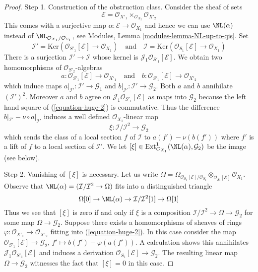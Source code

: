 \begin{proof}
\medskip\noindent
Step 1. Construction of the obstruction class. Consider the sheaf
of sets
$$
\mathcal{E} = \mathcal{O}_{X'_1} \times_{\mathcal{O}_{X_2}} \mathcal{O}_{X'_2}
$$
This comes with a surjective map $\alpha : \mathcal{E} \to \mathcal{O}_{X_1}$
and hence we can use $\NL(\alpha)$ instead of
$\NL_{\mathcal{O}_{X_1}/\mathcal{O}_{S_1}}$, see
Modules, Lemma \ref{modules-lemma-NL-up-to-qis}.
Set
$$
\mathcal{I}' =
\text{Ker}(\mathcal{O}_{S'_1}[\mathcal{E}] \to \mathcal{O}_{X_1})
\quad\text{and}\quad
\mathcal{I} =
\text{Ker}(\mathcal{O}_{S_1}[\mathcal{E}] \to \mathcal{O}_{X_1})
$$
There is a surjection $\mathcal{I}' \to \mathcal{I}$ whose kernel
is $\mathcal{J}_1\mathcal{O}_{S'_1}[\mathcal{E}]$.
We obtain two homomorphisms of $\mathcal{O}_{S'_2}$-algebras
$$
a : \mathcal{O}_{S'_1}[\mathcal{E}] \to \mathcal{O}_{X'_1}
\quad\text{and}\quad
b : \mathcal{O}_{S'_1}[\mathcal{E}] \to \mathcal{O}_{X'_2}
$$
which induce maps $a|_{\mathcal{I}'} : \mathcal{I}' \to \mathcal{G}_1$ and
$b|_{\mathcal{I}'} : \mathcal{I}' \to \mathcal{G}_2$. Both $a$ and $b$
annihilate $(\mathcal{I}')^2$. Moreover $a$ and $b$ agree on
$\mathcal{J}_1\mathcal{O}_{S'_1}[\mathcal{E}]$ as maps into $\mathcal{G}_2$
because the left hand square of (\ref{equation-huge-2}) is commutative.
Thus the difference
$b|_{\mathcal{I}'} - \nu \circ a|_{\mathcal{I}'}$
induces a well defined $\mathcal{O}_{X_1}$-linear map
$$
\xi : \mathcal{I}/\mathcal{I}^2 \longrightarrow \mathcal{G}_2
$$
which sends the class of a local section $f$ of $\mathcal{I}$ to
$a(f') - \nu(b(f'))$ where $f'$ is a lift of $f$ to a local
section of $\mathcal{I}'$. We let
$[\xi] \in \text{Ext}^1_{\mathcal{O}_{X_1}}(\NL(\alpha), \mathcal{G}_2)$
be the image (see below).

\medskip\noindent
Step 2. Vanishing of $[\xi]$ is necessary. Let us write
$\Omega = \Omega_{\mathcal{O}_{S_1}[\mathcal{E}]/\mathcal{O}_{S_1}}
\otimes_{\mathcal{O}_{S_1}[\mathcal{E}]} \mathcal{O}_{X_1}$.
Observe that $\NL(\alpha) = (\mathcal{I}/\mathcal{I}^2 \to \Omega)$
fits into a distinguished triangle
$$
\Omega[0] \to
\NL(\alpha) \to
\mathcal{I}/\mathcal{I}^2[1] \to
\Omega[1]
$$
Thus we see that $[\xi]$ is zero if and only if $\xi$
is a composition $\mathcal{I}/\mathcal{I}^2 \to \Omega \to \mathcal{G}_2$
for some map $\Omega \to \mathcal{G}_2$. Suppose there exists a
homomorphisms of sheaves of rings
$\varphi : \mathcal{O}_{X'_1} \to \mathcal{O}_{X'_2}$ fitting into
(\ref{equation-huge-2}). In this case consider the map
$\mathcal{O}_{S'_1}[\mathcal{E}] \to \mathcal{G}_2$,
$f' \mapsto b(f') - \varphi(a(f'))$. A calculation
shows this annihilates $\mathcal{J}_1\mathcal{O}_{S'_1}[\mathcal{E}]$
and induces a derivation $\mathcal{O}_{S_1}[\mathcal{E}] \to \mathcal{G}_2$.
The resulting linear map $\Omega \to \mathcal{G}_2$ witnesses the
fact that $[\xi] = 0$ in this case.


\end{proof}
